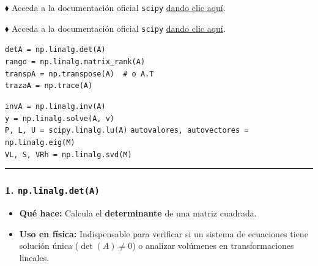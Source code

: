 \documentclass[12pt]{article}
\begin{document}
\begin{cajaflex}

$\blacklozenge$ Acceda a la documentación oficial \lstinline|scipy| 
\href{https://docs.scipy.org/doc/scipy/reference/linalg.html}{dando clic aquí}. 

$\blacklozenge$ Acceda a la documentación oficial \lstinline|scipy| 
\href{https://numpy.org/doc/stable/reference/routines.linalg.html}{dando clic aquí}. 

\lstinline|detA = np.linalg.det(A)| \quad \hfill {} \\
\lstinline|rango = np.linalg.matrix_rank(A)| \quad \hfill {} \\
\lstinline|transpA = np.transpose(A)  # o A.T| \quad \hfill {} \\
\lstinline|trazaA = np.trace(A)| \quad \hfill {}

\lstinline|invA = np.linalg.inv(A)| \quad \hfill {} \\
\lstinline|y = np.linalg.solve(A, v)| \quad \hfill {} \\
\lstinline|P, L, U = scipy.linalg.lu(A)| \quad \hfill {}
\lstinline|autovalores, autovectores = np.linalg.eig(M)| \quad \hfill {} \\
\lstinline|VL, S, VRh = np.linalg.svd(M)| \quad \hfill {}

\textcolor{teal!60!black}{\rule{\linewidth}{0.8pt}}

\vspace{0.1cm}

\subsubsection*{\textcolor{teal!70!black}{1. \texttt{np.linalg.det(A)}}}
\begin{itemize}
    \item \textbf{Qué hace:} Calcula el \textbf{determinante} de una matriz cuadrada.
    \item \textbf{Uso en física:} Indispensable para verificar si un sistema de ecuaciones tiene solución única ($\det(A) \neq 0$) o analizar volúmenes en transformaciones lineales.
\end{itemize}


\end{cajaflex}
\end{document}
